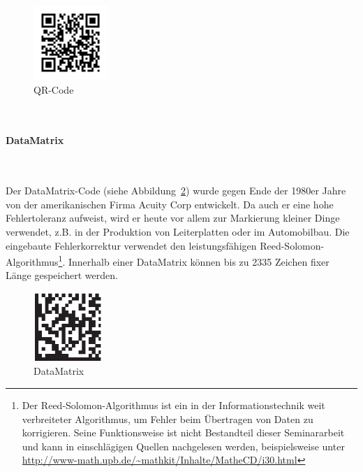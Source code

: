 \begin{figure}[htbp]%
	\centering
	\includegraphics[width=0.25\textwidth]{Bilder/QR_Code.png}
	\vspace{-0.2cm}
	\caption[QR-Code]{QR-Code\footnotemark}
	\label{fig:qrcode}	
\end{figure}~\\
\pagebreak
\paragraph{DataMatrix}~

Der DataMatrix-Code (siehe Abbildung~\ref{fig:datamatrix}) wurde gegen Ende der 1980er Jahre von der amerikanischen Firma Acuity Corp entwickelt. Da auch er eine hohe Fehlertoleranz aufweist, wird er heute vor allem zur Markierung kleiner Dinge verwendet, z.B. in der Produktion von Leiterplatten oder im Automobilbau. Die eingebaute Fehlerkorrektur verwendet den leistungsfähigen Reed-Solomon-Algorithmus\footnote{Der Reed-Solomon-Algorithmus ist ein in der Informationstechnik weit verbreiteter Algorithmus, um Fehler beim Übertragen von Daten zu korrigieren. Seine Funktionsweise ist nicht Bestandteil dieser Seminararbeit und kann in einschlägigen Quellen nachgelesen werden, beispielsweise unter \url{http://www-math.upb.de/~mathkit/Inhalte/MatheCD/i30.html}}. Innerhalb einer DataMatrix können bis zu 2335 Zeichen fixer Länge gespeichert werden.

\begin{figure}[htbp]%
	\centering
	\includegraphics[width=0.23\textwidth]{Bilder/DataMatrix.png} 
	\vspace{-0.2cm}
	\caption[DataMatrix]{DataMatrix\footnotemark}
	\label{fig:datamatrix}	
\end{figure}


